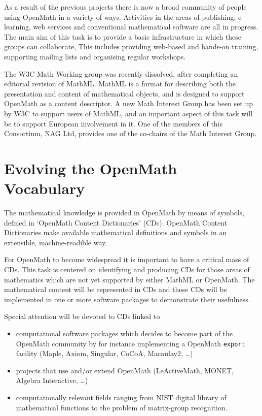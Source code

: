 \documentclass{euproposal}
\begin{document}

As a result of the previous projects there is now a broad community of
people using OpenMath in a variety of ways.  Activities in the areas of
publishing, e-learning, web services and conventional mathematical
software are all in progress.  The main aim of this task is to provide a
basic infrastructure in which these groups can collaborate,  This
includes providing web-based and hands-on training, supporting mailing
lists and organising regular workshops.

The W3C Math Working group was recently dissolved, after completing an
editorial revision of MathML.  MathML is a format for describing both
the presentation and content of mathematical objects, and is designed to
support OpenMath as a content descriptor.  A new Math Interest Group has
been set up by W3C to support users of MathML, and an important aspect
of this task will be to support European involvement in it.  One of the
members of this Consortium, NAG Ltd, provides one of the co-chairs of
the Math Interest Group.

\section{Evolving the OpenMath Vocabulary}
\label{sec:OCD}

The mathematical knowledge is provided in OpenMath by means of symbols,
defined in `OpenMath Content Dictionaries' (CDs).  OpenMath Content
Dictionaries make available mathematical definitions and symbols in an
extensible, machine-readible way.

For OpenMath to become widespread it is important to have a 
critical mass of CDs. This task is centered on
identifying and producing CDs for those areas of mathematics which are
not yet supported by either MathML or OpenMath. The mathematical
content will be represented in CDs and these CDs will be implemented
in one or more software packages to demonstrate their usefulness.

Special attention will be devoted to CDs linked to 
\begin{itemize}

\item computational software packages which decides to become part of the
OpenMath community by for instance implementing a OpenMath
\texttt{export} facility (Maple, Axiom, Singular, CoCoA, Macaulay2, \ldots)

\item projects that use and/or extend OpenMath (LeActiveMath, MONET,
Algebra Interactive, \ldots)
  
\item computationally relevant fields ranging from NIST digital
  library of mathematical functions to the problem of matrix-group
  recognition.

\end{itemize}
\end{document}

